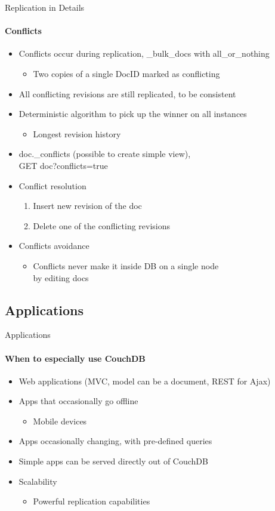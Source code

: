 \documentclass{beamer}
\begin{document}
\begin{frame}{Replication in Details}
  \framesubtitle{Conflicts}
  \begin{itemize}
    \item Conflicts occur during replication, \_bulk\_docs with all\_or\_nothing
    \begin{itemize}
      \item Two copies of a single DocID marked as conflicting
    \end{itemize}
    \item All conflicting revisions are still replicated, to be consistent
    \item Deterministic algorithm to pick up the winner on all instances
    \begin{itemize}
      \item Longest revision history
    \end{itemize}
    \item doc.\_conflicts (possible to create simple view),\\GET doc?conflicts=true
    \item Conflict resolution
    \begin{enumerate}
      \item Insert new revision of the doc
      \item Delete one of the conflicting revisions
    \end{enumerate}
    \item Conflicts avoidance
    \begin{itemize}
      \item Conflicts never make it inside DB on a single node\\by editing docs
    \end{itemize}
  \end{itemize}
\end{frame}

\subsection{Applications}
\begin{frame}{Applications}
  \framesubtitle{When to especially use CouchDB}
  \begin{itemize}
    \item Web applications (MVC, model can be a document, REST for Ajax)
    \item Apps that occasionally go offline
    \begin{itemize}
      \item Mobile devices
    \end{itemize}
    \item Apps occasionally changing, with pre-defined queries
    \item Simple apps can be served directly out of CouchDB
    \item Scalability
    \begin{itemize}
      \item Powerful replication capabilities
    \end{itemize}
  \end{itemize}
\end{frame}
\end{document}
